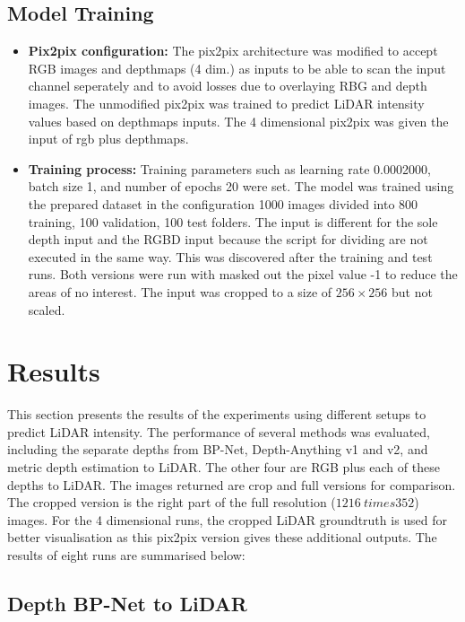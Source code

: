 \subsection{Model Training}\label{modeltraining}
\begin{itemize}
	\item \textbf{Pix2pix configuration:} The pix2pix architecture was modified to accept RGB images and depthmaps (4 dim.) as inputs to be able to scan the input channel seperately and to avoid losses due to overlaying RBG and depth images. The unmodified pix2pix was trained to predict LiDAR intensity values based on depthmaps inputs. The 4 dimensional pix2pix was given the input of rgb plus depthmaps.
	\item \textbf{Training process:} Training parameters such as learning rate 0.0002000, batch size 1, and number of epochs 20 were set. The model was trained using the prepared dataset in the configuration 1000 images divided into 800 training, 100 validation, 100 test folders. The input is different for the sole depth input and the RGBD input because the script for dividing are not executed in the same way. This was discovered after the training and test runs. Both versions were run with masked out the pixel value -1 to reduce the areas of no interest. The input was cropped to a size of $256 \times 256$  but not scaled.
\end{itemize}

\section{Results} \label{results}

This section presents the results of the experiments using different setups to predict LiDAR intensity. The performance of several methods was evaluated, including the separate depths from BP-Net, Depth-Anything v1 and v2, and metric depth estimation to LiDAR. The other four are RGB plus each of these depths to LiDAR. The images returned are crop and full versions for comparison. The cropped version is the right part of the full resolution ($1216 \ times 352$) images. For the 4 dimensional runs, the cropped LiDAR groundtruth is used for better visualisation as this pix2pix version gives these additional outputs. The results of eight runs are summarised below:
\subsection{Depth BP-Net to LiDAR}

